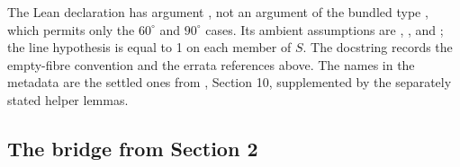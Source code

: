 \documentclass[11pt]{amsart}
\begin{document}
The Lean declaration has argument ,
not an argument of the bundled type , which permits
only the $60^\circ$ and $90^\circ$ cases. Its ambient assumptions are
, ,
and ; the line hypothesis is
 equal to 1 on each member of $S$.
The docstring records the empty-fibre convention and the
errata references above. The names in the metadata are the settled
ones from , Section 10, supplemented by the
separately stated helper lemmas.

\subsection{The bridge from Section 2}
\end{document}
